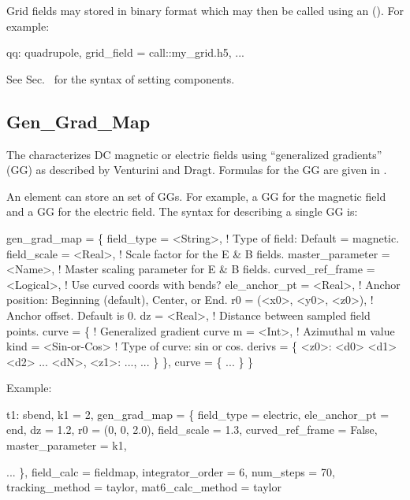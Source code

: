 Grid fields may stored in  binary format which may then be called using an 
(). For example:
\begin{example}
  qq: quadrupole, grid_field = call::my_grid.h5, ...
\end{example}

See Sec.~ for the syntax of setting  components.

\subsection{Gen_Grad_Map}
\label{s:gen.grad.map}

The  characterizes DC magnetic or electric fields using ``generalized gradients''
(GG) as described by Venturini and Dragt\cite{b:gen.grad}. Formulas for the GG are given in
.

An element can store an set of GGs. For example, a GG for the magnetic field and a GG for the
electric field. The syntax for describing a single GG is:
\begin{example}
  gen_grad_map = \{
    field_type       = <String>,    ! Type of field: Default = magnetic.
    field_scale      = <Real>,      ! Scale factor for the E & B fields.
    master_parameter = <Name>,      ! Master scaling parameter for E & B fields.
    curved_ref_frame = <Logical>,   ! Use curved coords with bends?
    ele_anchor_pt    = <Real>,      ! Anchor position: Beginning (default), Center, or End.
    r0               = (<x0>, <y0>, <z0>), ! Anchor offset. Default is 0.
    dz               = <Real>,             ! Distance between sampled field points.
    curve = \{                      ! Generalized gradient curve
      m = <Int>,                    ! Azimuthal m value
      kind = <Sin-or-Cos>           ! Type of curve: sin or cos.
      derivs = \{
        <z0>: <d0> <d1> <d2> ... <dN>,
        <z1>: ...,
        ...
      \}
    \},
    curve = \{
      ...
    \}
  \}
\end{example}

Example:
\begin{example}
  t1: sbend, k1 = 2, gen_grad_map = \{
    field_type = electric,   ele_anchor_pt = end, 
    dz = 1.2,                r0 = (0, 0, 2.0),
    field_scale = 1.3,       curved_ref_frame = False,
    master_parameter = k1,

    ...  \}, field_calc = fieldmap, integrator_order = 6, num_steps = 70, 
  tracking_method = taylor, mat6_calc_method = taylor
\end{example}

